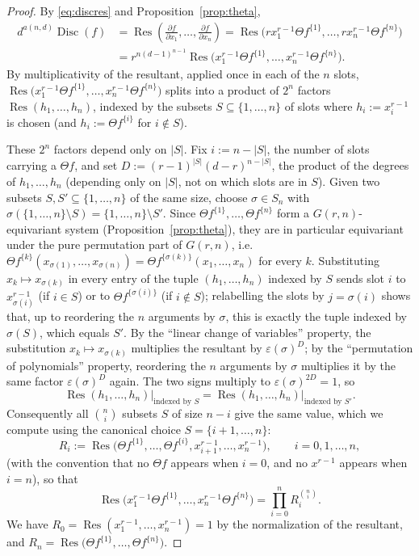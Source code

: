 \documentclass[10pt,a4paper]{amsart}
\newcommand{\Disc}{\operatorname{Disc}}
\newcommand{\Res}{\operatorname{Res}}
\theoremstyle{plain}
\theoremstyle{definition}
\begin{document}
\begin{proof}
By \eqref{eq:discres} and Proposition~\ref{prop:theta},
\begin{align*}
d^{a(n,d)}\Disc(f) &= \Res\left(\frac{\partial f}{\partial x_1},\dots,\frac{\partial f}{\partial x_n}\right) = \Res\big(rx_1^{r-1}\Theta f^{\{1\}},\dots,rx_n^{r-1}\Theta f^{\{n\}}\big) \\
&= r^{n(d-1)^{n-1}}\Res\big(x_1^{r-1}\Theta f^{\{1\}},\dots,x_n^{r-1}\Theta f^{\{n\}}\big).
\end{align*}
By multiplicativity of the resultant, applied once in each of the $n$ slots, $\Res\big(x_1^{r-1}\Theta f^{\{1\}},\dots,x_n^{r-1}\Theta f^{\{n\}}\big)$ splits into a product of $2^n$ factors $\Res(h_1,\dots,h_n)$, indexed by the subsets $S \subseteq \{1,\dots,n\}$ of slots where $h_i := x_i^{r-1}$ is chosen (and $h_i := \Theta f^{\{i\}}$ for $i \notin S$).

These $2^n$ factors depend only on $|S|$. Fix $i := n-|S|$, the number of slots carrying a $\Theta f$, and set $D := (r-1)^{|S|}(d-r)^{n-|S|}$, the product of the degrees of $h_1,\dots,h_n$ (depending only on $|S|$, not on which slots are in $S$). Given two subsets $S,S'\subseteq\{1,\dots,n\}$ of the same size, choose $\sigma \in S_n$ with $\sigma(\{1,\dots,n\}\setminus S) = \{1,\dots,n\}\setminus S'$. Since $\Theta f^{\{1\}},\dots,\Theta f^{\{n\}}$ form a $G(r,n)$-equivariant system (Proposition~\ref{prop:theta}), they are in particular equivariant under the pure permutation part of $G(r,n)$, i.e.\ $\Theta f^{\{k\}}(x_{\sigma(1)},\dots,x_{\sigma(n)}) = \Theta f^{\{\sigma(k)\}}(x_1,\dots,x_n)$ for every $k$. Substituting $x_k \mapsto x_{\sigma(k)}$ in every entry of the tuple $(h_1,\dots,h_n)$ indexed by $S$ sends slot $i$ to $x_{\sigma(i)}^{r-1}$ (if $i\in S$) or to $\Theta f^{\{\sigma(i)\}}$ (if $i\notin S$); relabelling the slots by $j=\sigma(i)$ shows that, up to reordering the $n$ arguments by $\sigma$, this is exactly the tuple indexed by $\sigma(S)$, which equals $S'$. By the ``linear change of variables'' property, the substitution $x_k \mapsto x_{\sigma(k)}$ multiplies the resultant by $\varepsilon(\sigma)^D$; by the ``permutation of polynomials'' property, reordering the $n$ arguments by $\sigma$ multiplies it by the same factor $\varepsilon(\sigma)^D$ again. The two signs multiply to $\varepsilon(\sigma)^{2D}=1$, so
\[
\Res(h_1,\dots,h_n)\big|_{\text{indexed by }S} = \Res(h_1,\dots,h_n)\big|_{\text{indexed by }S'}.
\]
Consequently all $\binom{n}{i}$ subsets $S$ of size $n-i$ give the same value, which we compute using the canonical choice $S=\{i+1,\dots,n\}$:
\[
R_i := \Res\big(\Theta f^{\{1\}},\dots,\Theta f^{\{i\}}, x_{i+1}^{r-1},\dots,x_n^{r-1}\big), \qquad i=0,1,\dots,n,
\]
(with the convention that no $\Theta f$ appears when $i=0$, and no $x^{r-1}$ appears when $i=n$), so that
\[
\Res\big(x_1^{r-1}\Theta f^{\{1\}},\dots,x_n^{r-1}\Theta f^{\{n\}}\big) = \prod_{i=0}^n R_i^{\binom{n}{i}}.
\]
We have $R_0 = \Res(x_1^{r-1},\dots,x_n^{r-1}) = 1$ by the normalization of the resultant, and $R_n = \Res\big(\Theta f^{\{1\}},\dots,\Theta f^{\{n\}}\big)$.


\end{proof}
\end{document}
